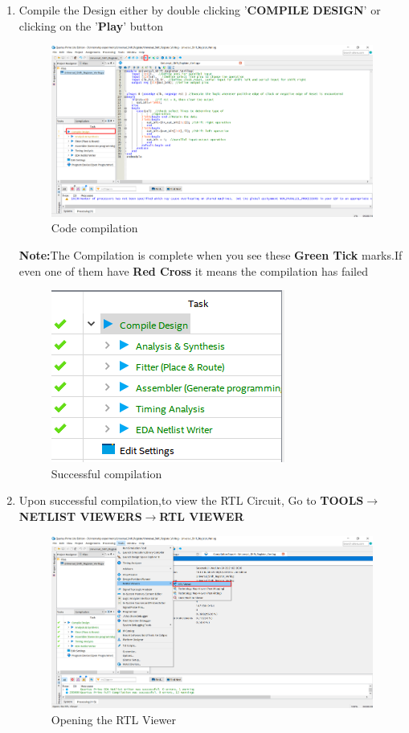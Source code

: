 \documentclass[12pt]{article}
\begin{document}
\begin{enumerate}
    \item Compile the Design either by double clicking '\textbf{COMPILE DESIGN}' or clicking on the '\textbf{Play}' button
    \begin{figure}[H]
        \centering
        \includegraphics[scale=0.4]{USR4.png}
        \caption{Code compilation}
    \end{figure}
    \textbf{Note:}The Compilation is complete when you see these \textbf{Green Tick} marks.If even one of them have \textbf{Red Cross} it means the compilation has failed
    \begin{figure}[H]
        \centering
        \includegraphics[scale=0.6]{Implementation_quartus/4_1.png}
        \caption{Successful compilation}
    \end{figure}
    
    \item Upon successful compilation,to view the RTL Circuit, Go to \textbf{TOOLS$\rightarrow$NETLIST VIEWERS$\rightarrow$RTL VIEWER}
    \begin{figure}[H]
        \centering
        \includegraphics[width=14cm,keepaspectratio]{usr5.png}
        \caption{Opening the RTL Viewer}
    \end{figure}
\end{enumerate}
\end{document}
